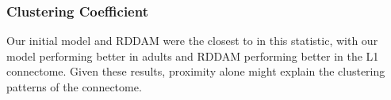 \subsubsection{Clustering Coefficient} Our initial model and RDDAM were the closest to \ce in this statistic, with our model performing better in adults and RDDAM performing better in the L1 connectome. Given these results, proximity alone might explain the clustering patterns of the \ce connectome. 